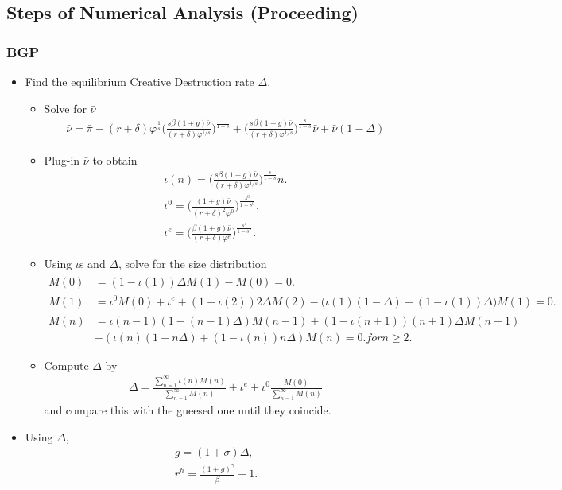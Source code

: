 \documentclass[a4paper,12pt]{article}
\begin{document}
\clearpage
\subsection*{Steps of Numerical Analysis (Proceeding)}
\subsubsection*{BGP}
\begin{itemize}
    \item Find the equilibrium Creative Destruction rate $\Delta$.
    \begin{itemize}
        \item Solve for $\bar{\nu}$
        \begin{align}
            \bar{\nu} = \bar{\pi} -(r+\delta) \varphi^\frac{1}{s}\Big(\frac{s\beta (1+g)\bar\nu}{(r+\delta)\varphi^{1/s}}\Big)^\frac{1}{1-s} + \Big(\frac{s\beta (1+g)\bar\nu}{(r+\delta)\varphi^{1/s}}\Big)^\frac{s}{1-s} \bar{\nu} + \bar{\nu}(1-\Delta)
        \end{align}
        \item Plug-in $\bar{\nu}$ to obtain
        \begin{align}
            \iota(n) = \Big(\frac{s\beta (1+g)\bar\nu}{(r+\delta)\varphi^{1/s}}\Big)^\frac{s}{1-s}n.\\
            \iota^0 = \Big(\frac{(1+g)\bar \nu}{(r+\delta)^2\varphi^0}\Big)^\frac{s^0}{1-s^0}.\\
            \iota^e = \Big(\frac{\beta (1+g)\bar \nu}{(r+\delta)\varphi^e}\Big)^\frac{s^e}{1-s^e}.
        \end{align}
        \item Using $\iota$s and $\Delta$, solve for the size distribution
        \begin{align}
            \dot{M}(0) &= (1-\iota(1))\Delta M(1) - M(0) = 0.\\
            \dot{M}(1) &= \iota^0 M(0) + \iota^e+(1-\iota(2))2\Delta M(2)-\big(\iota(1)(1-\Delta)+ (1-\iota(1))\Delta \big)M(1) = 0.\\
            \dot{M}(n) &= \iota(n-1)(1-(n-1)\Delta)M(n-1)+(1-\iota(n+1))(n+1)\Delta M(n+1) \\
            &- (\iota(n)(1-n\Delta) + (1-\iota(n))n \Delta )M(n) =0. for n\geq 2.
        \end{align}
        \item Compute $\Delta$ by
        \begin{align}
            \Delta = \frac{\sum_{n=1}^\infty \iota(n)M(n)}{\sum_{n=1}^\infty M(n)}+ \iota^e + \iota^0 \frac{M(0)}{\sum_{n=1}^{\infty}M(n)}
        \end{align}
        and compare this with the gueesed one until they coincide.
    \end{itemize}
    \item Using $\Delta$, 
    \begin{align}
        g = (1+\sigma) \Delta, \\
        r^h = \frac{(1+g)^\gamma }{\beta} - 1.
    \end{align}
\end{itemize}
\end{document}
